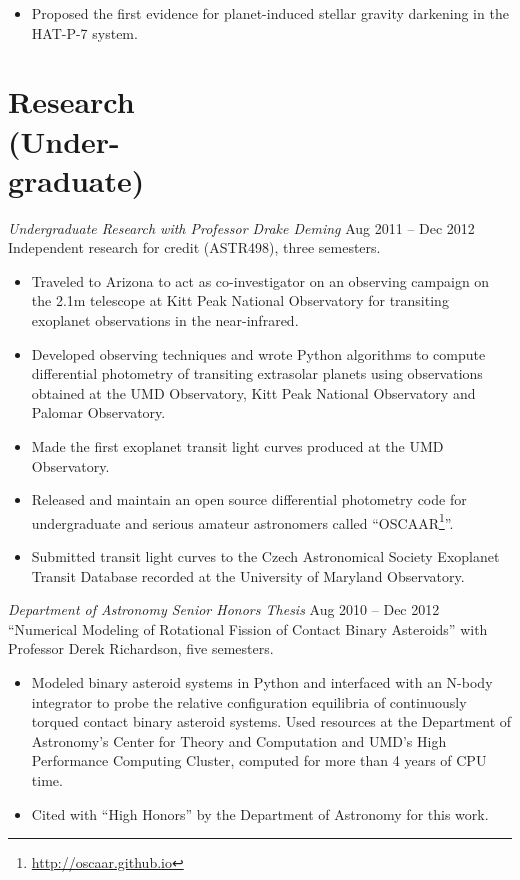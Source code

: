 \documentclass[margin]{res}
\begin{document}
\begin{resume}
\begin{itemize}
\item Proposed the first evidence for planet-induced stellar gravity darkening in the HAT-P-7 system.\\
\end{itemize}  

\section{Research \\(Under-\\graduate)} 
{\sl Undergraduate Research with Professor Drake Deming} \hfill            Aug 2011 -- Dec 2012 \\
Independent research for credit (ASTR498), three semesters. 
\begin{itemize}
\item Traveled to Arizona to act as co-investigator on an observing campaign on the 2.1m telescope at Kitt Peak National Observatory for transiting exoplanet observations in the near-infrared. 

\item Developed observing techniques and wrote Python algorithms to compute differential photometry of transiting extrasolar planets using observations obtained at the UMD Observatory, Kitt Peak National Observatory and Palomar Observatory. 

\item Made the first exoplanet transit light curves produced at the UMD Observatory.

\item Released and maintain an open source differential photometry code for undergraduate and serious amateur astronomers called ``OSCAAR\footnote{\url{http://oscaar.github.io}}''.

\item Submitted transit light curves to the Czech Astronomical Society Exoplanet Transit Database recorded at the University of Maryland Observatory.
\end{itemize} 

{\sl Department of Astronomy Senior Honors Thesis} \hfill Aug 2010 -- Dec 2012 \\
``Numerical Modeling of Rotational Fission of Contact Binary Asteroids'' with Professor Derek Richardson, five semesters. 
\begin{itemize}   
\item Modeled binary asteroid systems in Python and interfaced with an N-body integrator to probe the relative configuration equilibria of continuously torqued 
contact binary asteroid systems. Used resources at the Department of Astronomy's Center for Theory and Computation 
and UMD's High Performance Computing Cluster, computed for more than 4 years of CPU time. 
\item Cited with ``High Honors'' by the Department of Astronomy for this work.
\end{itemize}


\end{resume}
\end{document}
